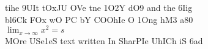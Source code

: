 \documentclass{article}%
\begin{document}
%
\normalsize%
tihe 9UIt tOxJU OVe tne 1O2Y dO9 and the 6Iig\\
bl6Ck FOx wO PC bY COOhIe O 1Ong hM3 a80\\
$\lim_{x \rightarrow \infty} x^{2} = s$\\
MOre USe1eS text written In SharPIe UhICh iS 6ad\\%
\end{document}
